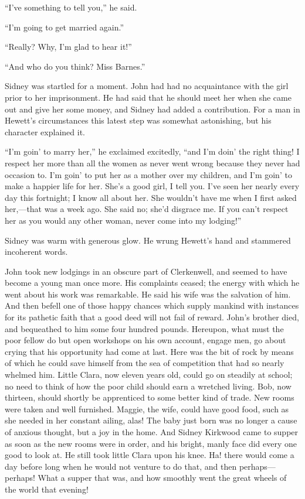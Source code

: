 ``I've something to tell you,'' he said.

``I'm going to get married again.''

``Really? Why, I'm glad to hear it!''

``And who do you think? Miss Barnes.''

Sidney was startled for a moment. John had had no acquaintance with the
girl prior to her imprisonment. He had said that he should meet her when
she came out and give her some money, and Sidney had added a
contribution. For a man in Hewett's circumstances this latest step was
{}somewhat astonishing, but his character explained it.

``I'm goin' to marry her,'' he exclaimed excitedly, ``and I'm doin' the
right thing! I respect her more than all the women as never went wrong
because they never had occasion to. I'm goin' to put her as a mother
over my children, and I'm goin' to make a happier life for her. She's a
good girl, I tell you. I've seen her nearly every day this fortnight; I
know all about her. She wouldn't have me when I first asked her,---that
was a week ago. She said no; she'd disgrace me. If you can't respect her
as you would any other woman, never come into my lodging!''

Sidney was warm with generous glow. He wrung Hewett's hand and stammered
incoherent words.

John took new lodgings in an obscure part of Clerkenwell, and seemed to
have become a young man once more. His complaints ceased; the energy
with which he went about his work was remarkable. He said his wife {}was
the salvation of him. And then befell one of those happy chances which
supply mankind with instances for its pathetic faith that a good deed
will not fail of reward. John's brother died, and bequeathed to him some
four hundred pounds. Hereupon, what must the poor fellow do but open
workshops on his own account, engage men, go about crying that his
opportunity had come at last. Here was the bit of rock by means of which
he could save himself from the sea of competition that had so nearly
whelmed him. Little Clara, now eleven years old, could go on steadily at
school; no need to think of how the poor child should earn a wretched
living. Bob, now thirteen, should shortly be apprenticed to some better
kind of trade. New rooms were taken and well furnished. Maggie, the
wife, could have good food, such as she needed in her constant ailing,
alas! The baby just born was no longer a cause of anxious thought, but a
joy in the home. And Sidney Kirkwood came to supper as soon as the new
rooms were in order, and his bright, {}manly face did every one good to
look at. He still took little Clara upon his knee. Ha! there would come
a day before long when he would not venture to do that, and then
perhaps---perhaps! What a supper that was, and how smoothly went the
great wheels of the world that evening!

